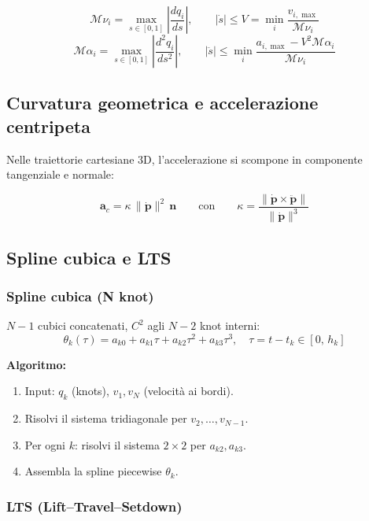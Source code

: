 \documentclass[11pt, a4paper]{article}
\begin{document}
\begin{formulabox}
\[
\mathcal{M}\nu_i = \max_{s\in[0,1]} \left|\frac{dq_i}{ds}\right|, \qquad
|\dot{s}| \le V = \min_i \frac{v_{i,\max}}{\mathcal{M}\nu_i}
\]
\[
\mathcal{M}\alpha_i = \max_{s\in[0,1]} \left|\frac{d^2q_i}{ds^2}\right|, \qquad
|\ddot{s}| \le \min_i \frac{a_{i,\max} - V^2 \mathcal{M}\alpha_i}{\mathcal{M}\nu_i}
\]
\end{formulabox}

\subsection{Curvatura geometrica e accelerazione centripeta}

Nelle traiettorie cartesiane 3D, l'accelerazione si scompone in componente tangenziale e
normale:
\begin{formulabox}
\[
\mathbf{a}_c = \kappa\,\|\dot{\mathbf{p}}\|^2\,\mathbf{n}
\qquad\text{con}\qquad
\kappa = \frac{\|\dot{\mathbf{p}} \times \ddot{\mathbf{p}}\|}{\|\dot{\mathbf{p}}\|^3}
\]
\end{formulabox}

\subsection{Spline cubica e LTS}

\subsubsection{Spline cubica (N knot)}

$N-1$ cubici concatenati, $C^2$ agli $N-2$ knot interni:
\[
\theta_k(\tau) = a_{k0} + a_{k1}\tau + a_{k2}\tau^2 + a_{k3}\tau^3, \quad
\tau = t - t_k \in [0,\, h_k]
\]

\textbf{Algoritmo:}
\begin{enumerate}[itemsep=2pt]
  \item Input: $q_k$ (knots), $v_1, v_N$ (velocità ai bordi).
  \item Risolvi il sistema tridiagonale per $v_2,\ldots,v_{N-1}$.
  \item Per ogni $k$: risolvi il sistema $2\times2$ per $a_{k2}, a_{k3}$.
  \item Assembla la spline piecewise $\theta_k$.
\end{enumerate}

\subsubsection{LTS (Lift–Travel–Setdown)}
\end{document}
